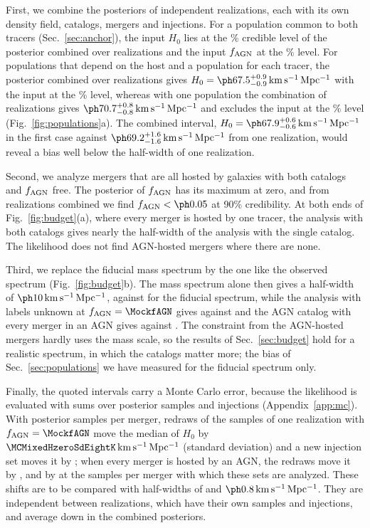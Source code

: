\documentclass[aps,prd,reprint,amsmath,amssymb,nofootinbib]{revtex4-2}
\newcommand{\kmsMpc}{\,{\rm km\,s^{-1}\,Mpc^{-1}}}
\newcommand{\fAGN}{f_{\rm AGN}}
\begin{document}
First, we combine the posteriors of independent realizations, each with its own density field, catalogs, mergers and injections.
For a population common to both tracers (Sec.~\ref{sec:anchor}), the input $H_0$ lies at the \IndRecHzeroCL\% credible level of the posterior combined over \NrealKnown{} realizations and the input $\fAGN$ at the \IndRecfAGNCL\% level.
For populations that depend on the host and a population for each tracer, the posterior combined over \NrealHD{} realizations gives $H_0=\IndTwoPopHzeroComb\kmsMpc$ with the input at the \IndTwoPopCL\% level, whereas with one population the combination of \NrealHDSingle{} realizations gives $\IndOnePopHzeroComb\kmsMpc$ and excludes the input at the \IndOnePopCL\% level (Fig.~\ref{fig:populations}a). %
The combined interval, $H_0=\IndRecHzeroComb\kmsMpc$ in the first case against $\IndAnchorHzero\kmsMpc$ from one realization, would reveal a bias well below the half-width of one realization.

Second, we analyze mergers that are all hosted by galaxies with both catalogs and $\fAGN$ free.
The posterior of $\fAGN$ has its maximum at zero, and from \IndNreal{} realizations combined we find $\fAGN<\IndZerofAGNUL$ at 90\% credibility. %
At both ends of Fig.~\ref{fig:budget}(a), where every merger is hosted by one tracer, the analysis with both catalogs gives nearly the half-width of the analysis with the single catalog. %
The likelihood does not find AGN-hosted mergers where there are none. %

Third, we replace the fiducial mass spectrum by the one like the observed spectrum (Fig.~\ref{fig:budget}b).
The mass spectrum alone then gives a half-width of $\IndObsHWSpec\kmsMpc$, against \IndHWSpec{} for the fiducial spectrum, while the analysis with labels unknown at $\fAGN=\MockfAGN$ gives \IndObsHWMix{} against \IndHWMix{} and the AGN catalog with every merger in an AGN gives \IndObsHWAGN{} against \IndHWAGN. %
The constraint from the AGN-hosted mergers hardly uses the mass scale, so the results of Sec.~\ref{sec:budget} hold for a realistic spectrum, in which the catalogs matter more; the bias of Sec.~\ref{sec:populations} we have measured for the fiducial spectrum only. %

Finally, the quoted intervals carry a Monte Carlo error, because the likelihood is evaluated with sums over posterior samples and injections (Appendix~\ref{app:mc}).
With \ProdNsamp{} posterior samples per merger, \MCMixedNEightK{} redraws of the samples of one realization with $\fAGN=\MockfAGN$ move the median of $H_0$ by $\MCMixedHzeroSdEightK\kmsMpc$ (standard deviation) and a new injection set moves it by \MCMixedInjHzeroSd; when every merger is hosted by an AGN, the redraws move it by \MCAGNHzeroSdEightK, and by \MCAGNHzeroSdThirtyTwoK{} at the \MCNsampHi{} samples per merger with which these sets are analyzed.
These shifts are to be compared with half-widths of \IndHWMix{} and $\IndHWAGN\kmsMpc$. %
They are independent between realizations, which have their own samples and injections, and average down in the combined posteriors.
\end{document}
